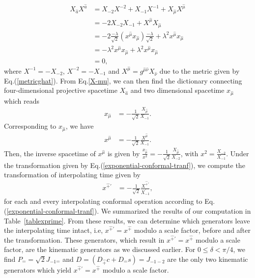 \documentclass[%
 reprint,
superscriptaddress,
 amsmath,amssymb,
 aps,
]{revtex4-2}
\begin{document}
\begin{align}
    {X}_{\hat{a}}{X}^{\hat{a}}&={X}_{-2}{X}^{-2}+{X}_{-1}{X}^{-1}+{X}_{\hat{\mu}}{X}^{\hat{\mu}} \nonumber \\
    &=-2{X}_{-2}{X}_{-1}+{X}^{\hat{\mu}}{X}_{\hat{\mu}}\nonumber \\
     &=-2\frac{-\lambda}{\sqrt{2}}(x^{\hat{\mu}}x_{\hat{\mu}})\frac{-\lambda}{\sqrt{2}}+\lambda^2{x}^{\hat{\mu}}{x}_{\hat{\mu}}\nonumber \\
     &=-\lambda^2{x}^{\hat{\mu}}{x}_{\hat{\mu}}+\lambda^2{x}^{\hat{\mu}}{x}_{\hat{\mu}}\nonumber \\
     &=0,
\end{align}
where ${X}^{-1}=-{X}_{-2}$, ${X}^{-2}=-{X}_{-1}$ and $X^{\hat \mu}=g^{\hat{\mu}\hat{\nu}}X_{\hat{\nu}}$ due to the metric
given by Eq.(\ref{metricghat}).
From Eq.\eqref{X-mu}, we can then find 
the dictionary connecting four-dimensional projective spacetime $X_{\hat{a}}$ and two dimensional spacetime $x_{\hat{\mu}}$ which reads
\begin{align}
    x_{\hat{\mu}}&=-\frac{1}{\sqrt{2}}\frac{{X}_{\hat{\mu}}}{ {X}_{-1}}.
\end{align}
Corresponding to $x_{\hat{\mu}}$, we have  
\begin{align}
    x^{\hat{\mu}}&=-\frac{1}{\sqrt{2}}\frac{{X}^{\hat{\mu}}}{ {X}_{-1}}.
\end{align}
Then, the inverse spacetime of $x^{\hat{\mu}}$ is given by $\frac{x_{\hat{\mu}}}{x^2}=-\frac{1}{\sqrt{2}}\frac{{X}_{\hat{\mu}}}{{X}_{-2}}$, with $x^2=\frac{{X}_{-2}}{{X}_{-1}}$. Under the transformation given by Eq.(\ref{exponential-conformal-tranf}), we compute the transformation of interpolating time given by
\begin{align}
    x^{\hat{+}\prime}&=-\frac{1}{\sqrt{2}}\frac{{X}^{\hat{+}\prime}}{ {X}^{\prime}_{-1}},
\end{align}
for each and every interpolating conformal operation according to Eq.(\ref{exponential-conformal-tranf}). We summarized the results of our computation in Table~\ref{tablexprime}.
From these results, we can determine which generators leave the interpolating time intact, i.e, $x^{\hat{+}\prime} = x^{\hat{+}}$ modulo a scale factor, before and after the transformation. These generators, which result in $x^{\hat{+}\prime}=x^{\hat{+}}$ modulo a scale factor, are the kinematic generators as we discussed earlier. For $0\leq \delta < \pi/4$, we find $P_{\hat -} = \sqrt{2}J_{-1\hat{-}}$ and $D=\left(D_{\hat{+}}c+D_{\hat{-}}s\right)=J_{-1 -2}$ are the only two kinematic generators which yield $x^{\hat{+}\prime}=x^{\hat{+}}$ modulo a scale factor.
\end{document}
